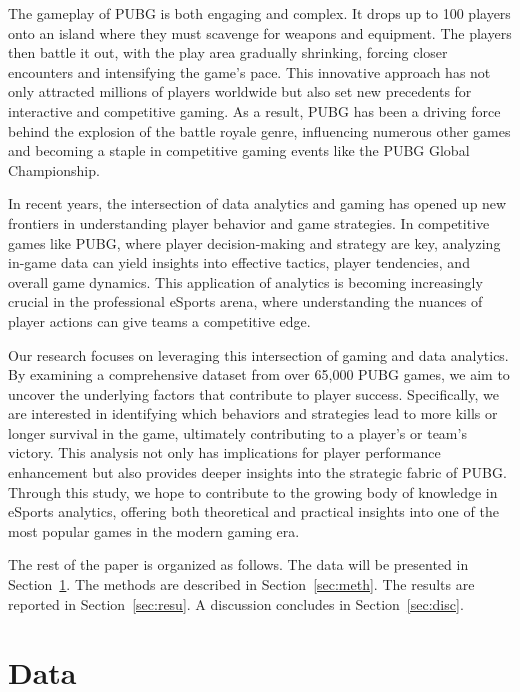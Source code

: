 \documentclass[12pt]{article}
\begin{document}
The gameplay of PUBG is both engaging and complex. It drops up to 100 players onto an island where they must scavenge for weapons and equipment. The players then battle it out, with the play area gradually shrinking, forcing closer encounters and intensifying the game's pace. This innovative approach has not only attracted millions of players worldwide but also set new precedents for interactive and competitive gaming. As a result, PUBG has been a driving force behind the explosion of the battle royale genre, influencing numerous other games and becoming a staple in competitive gaming events like the PUBG Global Championship.

In recent years, the intersection of data analytics and gaming has opened up new frontiers in understanding player behavior and game strategies. In competitive games like PUBG, where player decision-making and strategy are key, analyzing in-game data can yield insights into effective tactics, player tendencies, and overall game dynamics. This application of analytics is becoming increasingly crucial in the professional eSports arena, where understanding the nuances of player actions can give teams a competitive edge.

Our research focuses on leveraging this intersection of gaming and data analytics. By examining a comprehensive dataset from over 65,000 PUBG games, we aim to uncover the underlying factors that contribute to player success. Specifically, we are interested in identifying which behaviors and strategies lead to more kills or longer survival in the game, ultimately contributing to a player's or team's victory. This analysis not only has implications for player performance enhancement but also provides deeper insights into the strategic fabric of PUBG. Through this study, we hope to contribute to the growing body of knowledge in eSports analytics, offering both theoretical and practical insights into one of the most popular games in the modern gaming era.





The rest of the paper is organized as follows.
The data will be presented in Section~\ref{sec:data}.
The methods are described in Section~\ref{sec:meth}.
The results are reported in Section~\ref{sec:resu}.
A discussion concludes in Section~\ref{sec:disc}.


\section{Data}
\label{sec:data}
\end{document}
